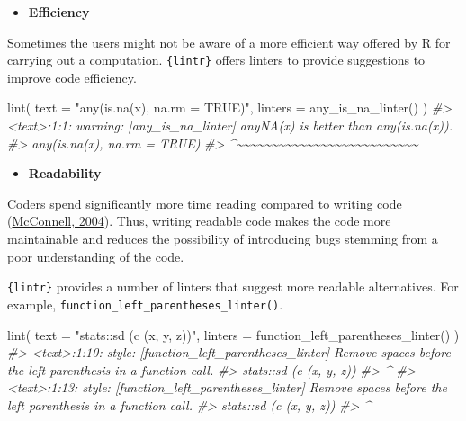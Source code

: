 \documentclass[10pt,a4paper,onecolumn]{article}
\newenvironment{Shaded}{\begin{snugshade}}{\end{snugshade}}
\newcommand{\AttributeTok}[1]{\textcolor[rgb]{0.77,0.63,0.00}{#1}}
\newcommand{\CommentTok}[1]{\textcolor[rgb]{0.56,0.35,0.01}{\textit{#1}}}
\newcommand{\FunctionTok}[1]{\textcolor[rgb]{0.00,0.00,0.00}{#1}}
\newcommand{\NormalTok}[1]{#1}
\newcommand{\StringTok}[1]{\textcolor[rgb]{0.31,0.60,0.02}{#1}}
\providecommand{\tightlist}{%
  \setlength{\itemsep}{0pt}\setlength{\parskip}{0pt}}
\begin{document}
\begin{itemize}
\tightlist
\item
  \textbf{Efficiency}
\end{itemize}

Sometimes the users might not be aware of a more efficient way offered
by R for carrying out a computation. \texttt{\{lintr\}} offers linters
to provide suggestions to improve code efficiency.

\begin{Shaded}
\begin{Highlighting}[]
\FunctionTok{lint}\NormalTok{(}
  \AttributeTok{text =} \StringTok{"any(is.na(x), na.rm = TRUE)"}\NormalTok{,}
  \AttributeTok{linters =} \FunctionTok{any\_is\_na\_linter}\NormalTok{()}
\NormalTok{)}
\CommentTok{\#\textgreater{} \textless{}text\textgreater{}:1:1: warning: [any\_is\_na\_linter] anyNA(x) is better than any(is.na(x)).}
\CommentTok{\#\textgreater{} any(is.na(x), na.rm = TRUE)}
\CommentTok{\#\textgreater{} \^{}\textasciitilde{}\textasciitilde{}\textasciitilde{}\textasciitilde{}\textasciitilde{}\textasciitilde{}\textasciitilde{}\textasciitilde{}\textasciitilde{}\textasciitilde{}\textasciitilde{}\textasciitilde{}\textasciitilde{}\textasciitilde{}\textasciitilde{}\textasciitilde{}\textasciitilde{}\textasciitilde{}\textasciitilde{}\textasciitilde{}\textasciitilde{}\textasciitilde{}\textasciitilde{}\textasciitilde{}\textasciitilde{}\textasciitilde{}}
\end{Highlighting}
\end{Shaded}

\begin{itemize}
\tightlist
\item
  \textbf{Readability}
\end{itemize}

Coders spend significantly more time reading compared to writing code
(\protect\hyperlink{ref-mcconnell2004code}{McConnell, 2004}). Thus,
writing readable code makes the code more maintainable and reduces the
possibility of introducing bugs stemming from a poor understanding of
the code.

\texttt{\{lintr\}} provides a number of linters that suggest more
readable alternatives. For example,
\texttt{function\_left\_parentheses\_linter()}.

\begin{Shaded}
\begin{Highlighting}[]
\FunctionTok{lint}\NormalTok{(}
  \AttributeTok{text =} \StringTok{"stats::sd (c (x, y, z))"}\NormalTok{,}
  \AttributeTok{linters =} \FunctionTok{function\_left\_parentheses\_linter}\NormalTok{()}
\NormalTok{)}
\CommentTok{\#\textgreater{} \textless{}text\textgreater{}:1:10: style: [function\_left\_parentheses\_linter] Remove spaces before the left parenthesis in a function call.}
\CommentTok{\#\textgreater{} stats::sd (c (x, y, z))}
\CommentTok{\#\textgreater{}          \^{}}
\CommentTok{\#\textgreater{} \textless{}text\textgreater{}:1:13: style: [function\_left\_parentheses\_linter] Remove spaces before the left parenthesis in a function call.}
\CommentTok{\#\textgreater{} stats::sd (c (x, y, z))}
\CommentTok{\#\textgreater{}             \^{}}
\end{Highlighting}
\end{Shaded}
\end{document}

